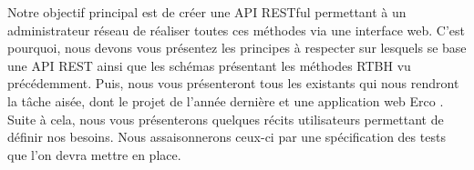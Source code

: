 \vspace{2em}

Notre objectif principal est de créer une API RESTful permettant à un administrateur réseau de réaliser toutes ces méthodes via une interface web. C'est pourquoi, nous devons vous présentez les principes à respecter sur lesquels se base une API REST ainsi que les schémas présentant les méthodes RTBH vu précédemment. Puis, nous vous présenteront tous les existants qui nous rendront la tâche aisée, dont le projet de l'année dernière \cite{PMCB18} et une application web Erco \cite{Erc16}. Suite à cela, nous vous présenterons quelques récits utilisateurs permettant de définir nos besoins. Nous assaisonnerons ceux-ci par une spécification des tests que l'on devra mettre en place.

